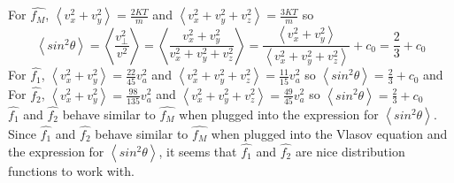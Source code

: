 \documentclass[12pt]{article}
\begin{document}
	\noindent For $\widehat{f_{M}}$, $\displaystyle \left\langle v_{x}^{2} + v_{y}^{2}\right\rangle = \frac{\displaystyle 2 K T}{\displaystyle m}$ and $\left\langle v_{x}^{2} + v_{y}^{2} +  v_{z}^{2}\right\rangle = \frac{\displaystyle 3 K T}{\displaystyle m}$ so $$\left\langle sin^{2}\theta\right\rangle = \left\langle \frac{\displaystyle v_{\perp}^{2}}{\displaystyle v^{2}}\right\rangle = \left\langle \frac{\displaystyle v_{x}^{2} + v_{y}^{2}}{\displaystyle v_{x}^{2} + v_{y}^{2} +  v_{z}^{2}}\right\rangle = \frac{\displaystyle \left\langle v_{x}^{2} + v_{y}^{2}\right\rangle}  {\displaystyle \left\langle v_{x}^{2} + v_{y}^{2} +  v_{z}^{2}\right\rangle} + c_{0} = \frac{2}{3} + c_{0}$$
	For $\hat{f_{1}}$, $\displaystyle \left\langle v_{x}^{2} + v_{y}^{2}\right\rangle = \frac{22}{45} v_{a}^2$ and $\displaystyle \left\langle v_{x}^{2} + v_{y}^{2} +  v_{z}^{2}\right\rangle = \frac{11}{15} v_{a}^2$ so $\displaystyle \left\langle sin^{2}\theta\right\rangle = \frac{2}{3} + c_{0}$ and \vspace{0.2cm} \\
	\noindent For $\hat{f_{2}}$, $\displaystyle \left\langle v_{x}^{2} + v_{y}^{2}\right\rangle = \frac{98}{135} v_{a}^2$ and $\displaystyle \left\langle v_{x}^{2} + v_{y}^{2} +  v_{z}^{2}\right\rangle = \frac{49}{45} v_{a}^2$ so $\displaystyle \left\langle sin^{2}\theta\right\rangle = \frac{2}{3} + c_{0}$ \\
	\noindent $\hat{f_{1}}$ and $\hat{f_{2}}$ behave similar to $\widehat{f_{M}}$ when plugged into the expression for $\left\langle sin^{2}\theta\right\rangle$. \\
	
	\noindent Since $\hat{f_{1}}$ and $\hat{f_{2}}$ behave similar to $\widehat{f_{M}}$ when plugged into the Vlasov equation and the expression for $\left\langle sin^{2}\theta\right\rangle$, it seems that $\hat{f_{1}}$ and $\hat{f_{2}}$ are nice distribution functions to work with.
	
	
\end{document}
